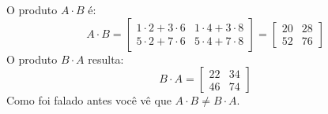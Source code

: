 O produto $A \cdot B$ é:
\begin{displaymath}
A\cdot B=
\begin{bmatrix}
  1 \cdot 2+3 \cdot 6 & 1 \cdot 4+3 \cdot 8 \\
  5 \cdot 2+7 \cdot 6 & 5 \cdot 4+7 \cdot 8
\end{bmatrix}
=
\begin{bmatrix}
  20 & 28\\
  52 & 76
\end{bmatrix}
\end{displaymath}
O produto $B\cdot A$ resulta:
\begin{displaymath}
  B\cdot A=
  \begin{bmatrix}
    22 & 34\\46 & 74
  \end{bmatrix}
\end{displaymath}
Como foi falado antes você vê que $A\cdot B\neq B\cdot A$.
